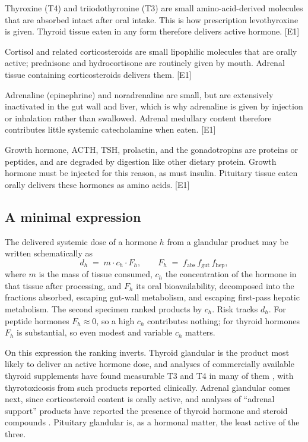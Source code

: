 \documentclass[11pt,a4paper]{article}
\theoremstyle{plain}
\theoremstyle{definition}
\theoremstyle{remark}
\newcommand{\tier}[1]{\textup{\textsc{[#1]}}}
\newcommand{\Eone}{\tier{E1}}
\begin{document}
\begin{description}[style=nextline,leftmargin=1.2em,itemsep=4pt]
\item[Iodothyronines.] Thyroxine (T4) and triiodothyronine (T3) are small amino-acid-derived molecules that are absorbed intact after oral intake. This is how prescription levothyroxine is given. Thyroid tissue eaten in any form therefore delivers active hormone. \Eone
\item[Steroids.] Cortisol and related corticosteroids are small lipophilic molecules that are orally active; prednisone and hydrocortisone are routinely given by mouth. Adrenal tissue containing corticosteroids delivers them. \Eone
\item[Catecholamines.] Adrenaline (epinephrine) and noradrenaline are small, but are extensively inactivated in the gut wall and liver, which is why adrenaline is given by injection or inhalation rather than swallowed. Adrenal medullary content therefore contributes little systemic catecholamine when eaten. \Eone
\item[Peptide and protein hormones.] Growth hormone, ACTH, TSH, prolactin, and the gonadotropins are proteins or peptides, and are degraded by digestion like other dietary protein. Growth hormone must be injected for this reason, as must insulin. Pituitary tissue eaten orally delivers these hormones as amino acids. \Eone
\end{description}

\subsection{A minimal expression}

The delivered systemic dose of a hormone $h$ from a glandular product may be written schematically as
\[
d_h \;=\; m \cdot c_h \cdot F_h, \qquad F_h \;=\; f_{\text{abs}}\, f_{\text{gut}}\, f_{\text{hep}},
\]
where $m$ is the mass of tissue consumed, $c_h$ the concentration of the hormone in that tissue after processing, and $F_h$ its oral bioavailability, decomposed into the fractions absorbed, escaping gut-wall metabolism, and escaping first-pass hepatic metabolism. The second specimen ranked products by $c_h$. Risk tracks $d_h$. For peptide hormones $F_h \approx 0$, so a high $c_h$ contributes nothing; for thyroid hormones $F_h$ is substantial, so even modest and variable $c_h$ matters.

On this expression the ranking inverts. Thyroid glandular is the product most likely to deliver an active hormone dose, and analyses of commercially available thyroid supplements have found measurable T3 and T4 in many of them \cite{kang2013}, with thyrotoxicosis from such products reported clinically. Adrenal glandular comes next, since corticosteroid content is orally active, and analyses of ``adrenal support'' products have reported the presence of thyroid hormone and steroid compounds \cite{akturk2018}. Pituitary glandular is, as a hormonal matter, the least active of the three.
\end{document}
